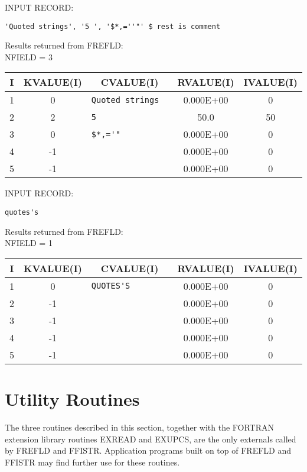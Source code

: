 INPUT RECORD:
\begin{verbatim}
'Quoted strings', '5 ', '$*,=''"' $ rest is comment
\end{verbatim}

Results returned from FREFLD:\\
NFIELD =    3

\begin{tabular}{|ccccc|} \hline \hline
I    &  KVALUE(I) &       CVALUE(I)       &   RVALUE(I)   &  IVALUE(I)\\\hline
1  &  0  &\verb*"Quoted strings  "  &    0.000E+00 &  0\\
2  &  2  &\verb*"5               "  &     50.0     &  50\\
3  &  0  &\verb*+$*,='"          +  &    0.000E+00 &  0\\
4  & -1  &\verb*"                "  &    0.000E+00 &  0\\
5  & -1  &\verb*"                "  &    0.000E+00 &  0\\ \hline \hline
\end{tabular}

INPUT RECORD:
\begin{verbatim}
quotes's
\end{verbatim}

Results returned from FREFLD:\\
NFIELD =    1

\begin{tabular}{|ccccc|} \hline \hline
I    &  KVALUE(I) &       CVALUE(I)       &   RVALUE(I)   &  IVALUE(I)\\\hline
1 &   0  &\verb*"QUOTES'S        "  &    0.000E+00 &  0\\
2 &  -1  &\verb*"                "  &    0.000E+00 &  0\\
3 &  -1  &\verb*"                "  &    0.000E+00 &  0\\
4 &  -1  &\verb*"                "  &    0.000E+00 &  0\\
5 &  -1  &\verb*"                "  &    0.000E+00 &  0\\ \hline \hline
\end{tabular}

\section{Utility Routines}
The three routines described in this section, together with the FORTRAN
extension library routines EXREAD and EXUPCS, are the only externals called
by FREFLD and FFISTR. Application programs built on top of FREFLD and FFISTR
may find further use for these routines.


